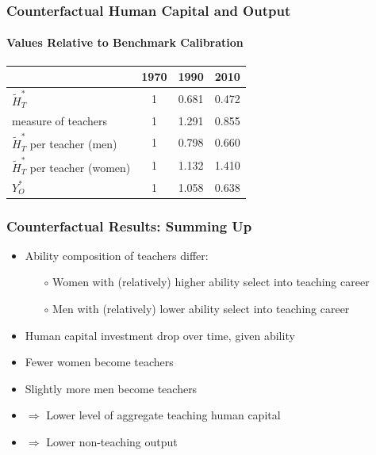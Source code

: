 \documentclass[11pt]{beamer}
\begin{document}
\begin{frame}
\frametitle{Counterfactual Human Capital and Output}
\framesubtitle{Values Relative to Benchmark Calibration}
\begin{table}
  \centering \begin{tabular}{lccc}
\toprule
& 1970 & 1990 & 2010 \\
\midrule
$\widetilde{H}_T^*$ & 1  & 0.681 & 0.472 \\
measure of teachers & 1 & 1.291 & 0.855\\
$\widetilde{H}_T^*$ per teacher (men)   & 1 & 0.798 & 0.660 \\
$\widetilde{H}_T^*$ per teacher (women)   & 1 & 1.132 &  1.410\\
$Y_O^*$ & 1 & 1.058 & 0.638 \\
\bottomrule
\end{tabular}
  \label{ }
\end{table}


\end{frame}

\begin{frame}
\frametitle{Counterfactual Results: Summing Up}
\begin{itemize}
    \item Ability composition of teachers differ:
    \begin{itemize}
				\item[$\circ$] Women with (relatively) higher ability select into teaching career %
                \item[$\circ$] Men with (relatively) lower ability select into teaching career %
    \end{itemize}
    \item Human capital investment drop over time, given ability %
    \item Fewer women become teachers
    \item Slightly more men become teachers
    \item $\Rightarrow$ Lower level of aggregate teaching human capital 
    \item $\Rightarrow$ Lower non-teaching output 
\end{itemize}
\end{frame}
\end{document}
